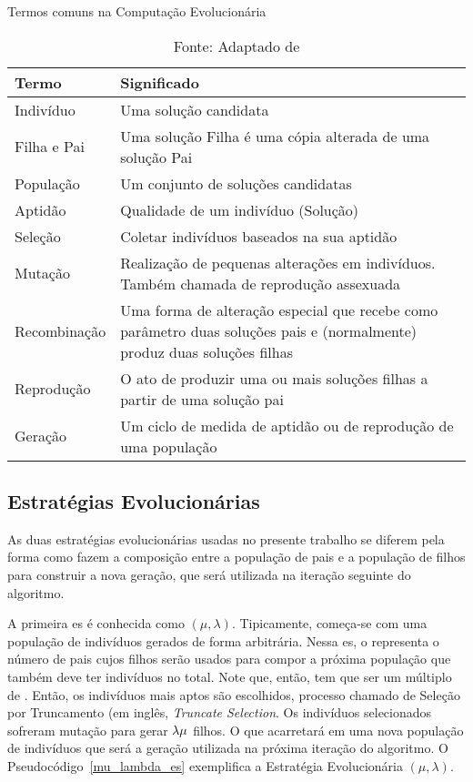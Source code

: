 \begin{table}[tp]
	\centering
	\caption{Termos comuns na Computação Evolucionária}
	\label{tbl:evo_dict}
	\begin{tabularx}{\linewidth}{|X|X|}
		\hline
		\textbf{Termo} & \textbf{Significado} \\
		\hline
		Indivíduo & Uma solução candidata \\
		\hline
		Filha e Pai & Uma solução Filha é uma cópia alterada de uma solução Pai \\
		\hline
		População & Um conjunto de soluções candidatas \\
		\hline
		Aptidão & Qualidade de um indivíduo (Solução) \\
		\hline
		Seleção & Coletar indivíduos baseados na sua aptidão \\
		\hline
		Mutação & Realização de pequenas alterações em indivíduos. Também chamada de reprodução assexuada \\
		\hline
		Recombinação & Uma forma de alteração especial que recebe como parâmetro duas soluções pais e (normalmente) produz duas soluções filhas \\
		\hline
		Reprodução & O ato de produzir uma ou mais soluções filhas a partir de uma solução pai \\
		\hline
		Geração & Um ciclo de medida de aptidão ou de reprodução de uma população \\
		\hline
	\end{tabularx}
	\caption*{Fonte: Adaptado de \citep{Luke2013Metaheuristics}}
\end{table}

\subsection{Estratégias Evolucionárias}

As duas estratégias evolucionárias usadas no presente trabalho se diferem pela 
forma como fazem a composição entre a população de pais e a população de filhos 
para construir a nova geração, que será utilizada na iteração seguinte do 
algoritmo.

A primeira \ac{es} é conhecida como $( \mu, \lambda )$. Tipicamente, começa-se 
com uma população de \lambda indivíduos gerados de forma arbitrária. Nessa 
\ac{es}, o \mu representa o número de pais cujos filhos serão usados para compor 
a próxima população que também deve ter \lambda indivíduos no total. Note que, 
então, \lambda tem que ser um múltiplo de \mu. Então, os \mu indivíduos mais 
aptos são escolhidos, processo chamado de Seleção por Truncamento (em inglês, 
\textit{Truncate Selection}. Os indivíduos selecionados sofreram mutação para 
gerar $ \lambda \/ \mu $ filhos. O que acarretará em uma nova população de 
\lambda indivíduos que será a geração utilizada na próxima iteração do 
algoritmo. O Pseudocódigo~\ref{mu_lambda_es} exemplifica a Estratégia 
Evolucionária $( \mu, \lambda )$.

